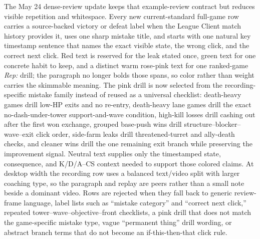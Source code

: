 \documentclass[12pt,letterpaper]{article}
\begin{document}
\noindent The May 24 dense-review update keeps that example-review contract but reduces visible repetition and whitespace. Every new current-standard full-game row carries a source-backed victory or defeat label when the League Client match history provides it, uses one sharp mistake title, and starts with one natural key timestamp sentence that names the exact visible state, the wrong click, and the correct next click. Red text is reserved for the leak stated once, green text for one concrete habit to keep, and a distinct warm rose-pink text for one ranked-game \emph{Rep:} drill; the paragraph no longer bolds those spans, so color rather than weight carries the skimmable meaning. The pink drill is now selected from the recording-specific mistake family instead of reused as a universal checklist: death-heavy games drill low-HP exits and no re-entry, death-heavy lane games drill the exact no-dash-under-tower support-and-wave condition, high-kill losses drill cashing out after the first won exchange, grouped base-push wins drill structure--blocker--wave--exit click order, side-farm leaks drill threatened-turret and ally-death checks, and cleaner wins drill the one remaining exit branch while preserving the improvement signal. Neutral text supplies only the timestamped state, consequence, and K/D/A--CS context needed to support those colored claims. At desktop width the recording row uses a balanced text/video split with larger coaching type, so the paragraph and replay are peers rather than a small note beside a dominant video. Rows are rejected when they fall back to generic review-frame language, label lists such as ``mistake category'' and ``correct next click,'' repeated tower--wave--objective--front checklists, a pink drill that does not match the game-specific mistake type, vague ``permanent thing'' drill wording, or abstract branch terms that do not become an if-this-then-that click rule.
\end{document}
